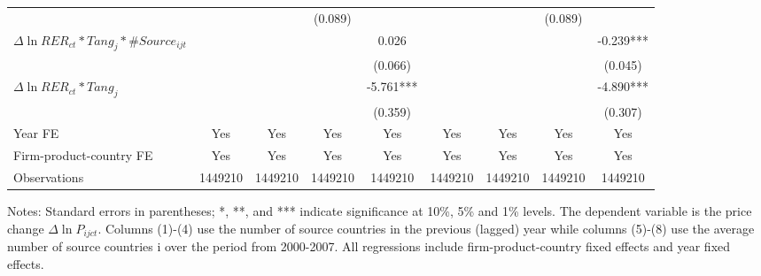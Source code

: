 \documentclass[12pt]{article}
\begin{document}
\begin{table}
{\begin{threeparttable}
\begin{tabular}{lcccccccc}
				&       &       & (0.089) &  &       &       & (0.089) &\\
				$\Delta \ln RER_{ct}*Tang_{j}*\#Source_{ijt}$ &       &       &       & 0.026
				 &       &       &       & -0.239***\\
				&       &       &       & (0.066) &       &       &       & (0.045)\\
				$\Delta \ln RER_{ct}*Tang_{j}$ &       &       &       & -5.761*** &       &       &       & -4.890***\\
				&       &       &       & (0.359) &       &       &       & (0.307)\\
				Year FE  & Yes   & Yes   & Yes   & Yes & Yes   & Yes   & Yes   & Yes\\
				Firm-product-country FE & Yes   & Yes   & Yes   & Yes & Yes   & Yes   & Yes   & Yes\\
				Observations & 1449210 & 1449210 & 1449210 & 1449210 & 1449210 & 1449210 & 1449210 & 1449210\\
				\bottomrule
			\end{tabular}
			\begin{tablenotes}
				\footnotesize
				\item[Notes:] Standard errors in parentheses; *, **, and *** indicate significance at 10\%, 5\% and 1\% levels. The dependent variable is the price change $\Delta \ln P_{ijct}$. Columns (1)-(4) use the number of source countries in the previous (lagged) year while columns (5)-(8) use the average number of source countries i over the period from 2000-2007. All regressions include firm-product-country fixed effects and year fixed effects.
			\end{tablenotes}
		\end{threeparttable}
	}
	\label{tab.source.lag}
\end{table}
\end{document}

